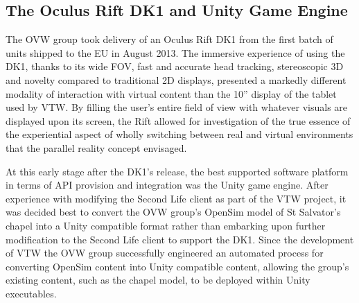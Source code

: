 


\subsection{The Oculus Rift DK1 and Unity Game Engine}

The OVW group took delivery of an Oculus Rift DK1 from the first batch of units shipped to the EU in August 2013. The immersive experience of using the DK1, thanks to its wide FOV, fast and accurate head tracking, stereoscopic 3D and novelty compared to traditional 2D displays, presented a markedly different modality of interaction with virtual content than the 10'' display of the tablet used by VTW. By filling the user's entire field of view with whatever visuals are displayed upon its screen, the Rift allowed for investigation of the true essence of the experiential aspect of wholly switching between real and virtual environments that the parallel reality concept envisaged.

At this early stage after the DK1's release, the best supported software platform in terms of API provision and integration was the Unity game engine. After experience with modifying the Second Life client as part of the VTW project, it was decided best to convert the OVW group's OpenSim model of St Salvator's chapel into a Unity compatible format rather than embarking upon further modification to the Second Life client to support the DK1. Since the development of VTW the OVW group successfully engineered an automated process for converting OpenSim content into Unity compatible content, allowing the group's existing content, such as the chapel model, to be deployed within Unity executables.

